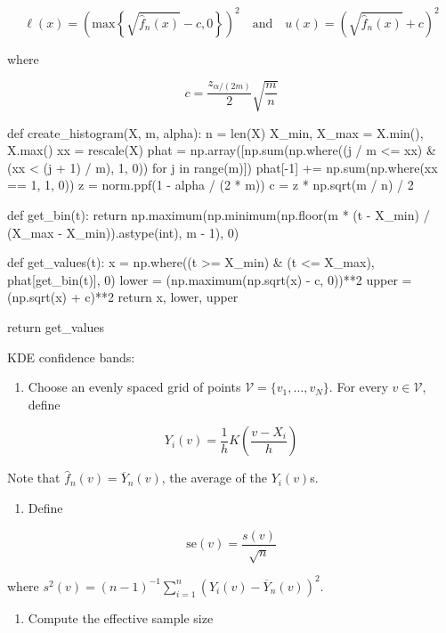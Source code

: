 \[
\ell(x) = \left( \text{max} \left\{\sqrt{\hat{f}_{n}(x)} - c, 0\right\} \right)^{2}
\quad \text{and} \quad
u(x) = \left(\sqrt{\hat{f}_{n}(x)} + c \right)^{2}
\]

where

\[
c = \frac{z_{\alpha / (2 m)}}{2} \sqrt{\frac{m}{n}}
\]

\begin{python}
def create_histogram(X, m, alpha):
    n = len(X)
    X_min, X_max = X.min(), X.max()
    xx = rescale(X)
    phat = np.array([np.sum(np.where((j / m <= xx) & (xx < (j + 1) / m), 1, 0)) for j in range(m)])
    phat[-1] += np.sum(np.where(xx == 1, 1, 0))
    z = norm.ppf(1 - alpha / (2 * m))
    c = z * np.sqrt(m / n) / 2
    
    def get_bin(t):
        return np.maximum(np.minimum(np.floor(m * (t - X_min) / (X_max - X_min)).astype(int), m - 1), 0)
    
    def get_values(t):
        x = np.where((t >= X_min) & (t <= X_max), phat[get_bin(t)], 0)
        lower = (np.maximum(np.sqrt(x) - c, 0))**2
        upper = (np.sqrt(x) + c)**2
        return x, lower, upper
    
    return get_values
\end{python}

KDE confidence bands:

\begin{enumerate}[tightlist,label={\arabic*.}]
\item
  Choose an evenly spaced grid of points
  \(\mathcal{V} = \{ v_{1}, \dots, v_N \}\). For every
  \(v \in \mathcal{V}\), define
\end{enumerate}

\[ Y_{i}(v) = \frac{1}{h} K \left( \frac{v - X_{i}}{h} \right) \]

Note that \(\hat{f}_{n}(v) = \overline{Y}_{n}(v)\), the average of the
\(Y_{i}(v)\)s.

\begin{enumerate}[tightlist,label={\arabic*.}]
\item
  Define
\end{enumerate}

\[ \text{se}(v) = \frac{s(v)}{\sqrt{n}} \]

where
\(s^{2}(v) = (n - 1)^{-1} \sum_{i=1}^{n} ( Y_{i}(v) - \overline{Y}_{n}(v) )^{2}\).

\begin{enumerate}[tightlist,label={\arabic*.},resume]
\item
  Compute the effective sample size
\end{enumerate}

